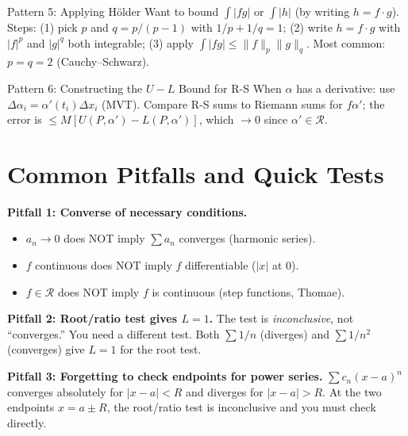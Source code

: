 \documentclass[11pt]{article}
\theoremstyle{myplain}
\theoremstyle{definition}
\theoremstyle{remark}
\begin{document}
\begin{technique}{Pattern 5: Applying Hölder}
Want to bound $\int |fg|$ or $\int |h|$ (by writing $h = f \cdot g$).
Steps: (1) pick $p$ and $q = p/(p-1)$ with $1/p + 1/q = 1$; (2) write $h = f \cdot g$ with $|f|^p$ and $|g|^q$ both integrable; (3) apply $\int|fg| \leq \|f\|_p\|g\|_q$.
Most common: $p = q = 2$ (Cauchy--Schwarz).
\end{technique}

\begin{technique}{Pattern 6: Constructing the $U-L$ Bound for R-S}
When $\alpha$ has a derivative: use $\Delta\alpha_i = \alpha'(t_i)\Delta x_i$ (MVT). Compare R-S sums to Riemann sums for $f\alpha'$; the error is $\leq M[U(P,\alpha') - L(P,\alpha')]$, which $\to 0$ since $\alpha' \in \mathscr{R}$.
\end{technique}

\section{Common Pitfalls and Quick Tests}

\begin{watchout}
\textbf{Pitfall 1: Converse of necessary conditions.}
\begin{itemize}
  \item $a_n \to 0$ does NOT imply $\sum a_n$ converges (harmonic series).
  \item $f$ continuous does NOT imply $f$ differentiable ($|x|$ at $0$).
  \item $f \in \mathscr{R}$ does NOT imply $f$ is continuous (step functions, Thomae).
\end{itemize}
\end{watchout}

\begin{watchout}
\textbf{Pitfall 2: Root/ratio test gives $L = 1$.}
The test is \emph{inconclusive}, not ``converges.'' You need a different test. Both $\sum 1/n$ (diverges) and $\sum 1/n^2$ (converges) give $L = 1$ for the root test.
\end{watchout}

\begin{watchout}
\textbf{Pitfall 3: Forgetting to check endpoints for power series.}
$\sum c_n(x-a)^n$ converges absolutely for $|x-a| < R$ and diverges for $|x-a| > R$. At the two endpoints $x = a \pm R$, the root/ratio test is inconclusive and you must check directly.
\end{watchout}
\end{document}
